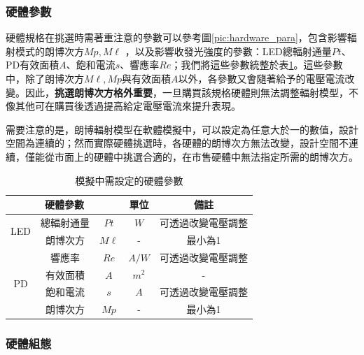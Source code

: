 \subsubsection{硬體參數}

硬體規格在挑選時需著重注意的參數可以參考圖\ref{pic:hardware_para}，包含影響輻射模式的朗博次方$Mp,M\ell$
，以及影響收發光強度的參數：LED總輻射通量$Pt$、PD有效面積$A$、飽和電流$s$、響應率$Re$；我們將這些參數統整於表\ref{tab:para_hardware}。這些參數中，除了朗博次方$M\ell,Mp$與有效面積$A$以外，各參數又會隨著給予的電壓電流改變。因此，\textbf{挑選朗博次方格外重要}，一旦購買該規格硬體則無法調整輻射模型，不像其他可在購買後透過提高給定電壓電流來提升表現。

需要注意的是，朗博輻射模型在軟體模擬中，可以設定為任意大於一的數值，設計空間為連續的；然而實際硬體挑選時，各硬體的朗博次方無法改變，設計空間不連續，僅能從市面上的硬體中挑選合適的，在市售硬體中無法指定所需的朗博次方。

\begin{table}[h]
\renewcommand{\arraystretch}{1.3}
\setlength{\arrayrulewidth}{0.15mm}
\setlength{\doublerulesep}{0.12mm}
\caption{模擬中需設定的硬體參數}
\label{tab:para_hardware}
\centering
\begin{tabular}{|c|cc|c|c|}
\hline
\multicolumn{3}{|c|}{\textbf{硬體參數}}  &\textbf{單位}  &  \textbf{備註}   \\
\hline
\multirow{2}{*}{LED} 
& 總輻射通量 &$Pt$ & $W$ & 可透過改變電壓調整 \\
 & 朗博次方& $M\ell$& -  & 最小為1 \\\hline
\multirow{4}{*}{PD} 
& 響應率 &$Re$ & $A/W$ & 可透過改變電壓調整 \\
& 有效面積& $A$& $m^2$ & - \\
& 飽和電流& $s$& $A$ & 可透過改變電壓調整 \\
& 朗博次方& $Mp$& -  & 最小為1 \\\hline
\end{tabular}
\end{table}



\subsubsection{硬體組態}

